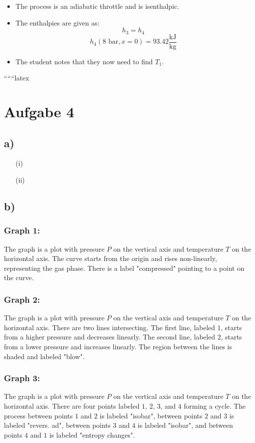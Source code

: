 \begin{itemize}
    \item The process is an adiabatic throttle and is isenthalpic.
    \item The enthalpies are given as:
    \[
    h_3 = h_4
    \]
    \[
    h_4 \left( 8 \text{ bar}, x = 0 \right) = 93.42 \frac{\text{kJ}}{\text{kg}}
    \]
    \item The student notes that they now need to find $T_1$.
\end{itemize}

``````latex


\section*{Aufgabe 4}

\subsection*{a)}
\begin{itemize}
    \item[(i)] 
    \item[(ii)] 
\end{itemize}

\subsection*{b)}
\subsubsection*{Graph 1:}
The graph is a plot with pressure \(P\) on the vertical axis and temperature \(T\) on the horizontal axis. The curve starts from the origin and rises non-linearly, representing the gas phase. There is a label "compressed" pointing to a point on the curve.

\subsubsection*{Graph 2:}
The graph is a plot with pressure \(P\) on the vertical axis and temperature \(T\) on the horizontal axis. There are two lines intersecting. The first line, labeled \(1\), starts from a higher pressure and decreases linearly. The second line, labeled \(2\), starts from a lower pressure and increases linearly. The region between the lines is shaded and labeled "blow".

\subsubsection*{Graph 3:}
The graph is a plot with pressure \(P\) on the vertical axis and temperature \(T\) on the horizontal axis. There are four points labeled \(1\), \(2\), \(3\), and \(4\) forming a cycle. The process between points \(1\) and \(2\) is labeled "isobar", between points \(2\) and \(3\) is labeled "revers. ad", between points \(3\) and \(4\) is labeled "isobar", and between points \(4\) and \(1\) is labeled "entropy changes".

